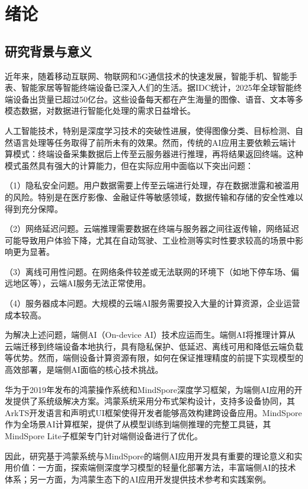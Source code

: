 \chapter{绪论}

\section{研究背景与意义}

近年来，随着移动互联网、物联网和5G通信技术的快速发展，智能手机、智能手表、智能家居等智能终端设备已深入人们的生活。据IDC统计，2025年全球智能终端设备出货量已超过50亿台。这些设备每天都在产生海量的图像、语音、文本等多模态数据，对数据进行智能化处理的需求日益增长\cite{krizhevsky2012imagenet}。

人工智能技术，特别是深度学习技术的突破性进展，使得图像分类、目标检测、自然语言处理等任务取得了前所未有的效果。然而，传统的AI应用主要依赖云端计算模式：终端设备采集数据后上传至云服务器进行推理，再将结果返回终端。这种模式虽然具有强大的计算能力，但在实际应用中面临以下突出问题：

（1）隐私安全问题。用户数据需要上传至云端进行处理，存在数据泄露和被滥用的风险。特别是在医疗影像、金融证件等敏感领域，数据传输和存储的安全性难以得到充分保障\cite{zhang2020edge}。

（2）网络延迟问题。云端推理需要数据在终端与服务器之间往返传输，网络延迟可能导致用户体验下降，尤其在自动驾驶、工业检测等实时性要求较高的场景中影响更为显著。

（3）离线可用性问题。在网络条件较差或无法联网的环境下（如地下停车场、偏远地区等），云端AI服务无法正常使用。

（4）服务器成本问题。大规模的云端AI服务需要投入大量的计算资源，企业运营成本较高。

为解决上述问题，端侧AI（On-device AI）技术应运而生。端侧AI将推理计算从云端迁移到终端设备本地执行，具有隐私保护、低延迟、离线可用和降低云端负载等优势\cite{lane2016deepx}。然而，端侧设备计算资源有限，如何在保证推理精度的前提下实现模型的高效部署，是端侧AI面临的核心技术挑战。

华为于2019年发布的鸿蒙操作系统和MindSpore深度学习框架，为端侧AI应用的开发提供了系统级解决方案。鸿蒙系统采用分布式架构设计，支持多设备协同，其ArkTS开发语言和声明式UI框架使得开发者能够高效构建跨设备应用。MindSpore作为全场景AI计算框架，提供了从模型训练到端侧推理的完整工具链，其MindSpore Lite子框架专门针对端侧设备进行了优化\cite{huawei2021harmony}。

因此，研究基于鸿蒙系统与MindSpore的端侧AI应用开发具有重要的理论意义和实用价值：一方面，探索端侧深度学习模型的轻量化部署方法，丰富端侧AI的技术体系；另一方面，为鸿蒙生态下的AI应用开发提供技术参考和实践案例。

